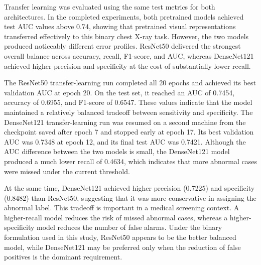 Transfer learning was evaluated using the same test metrics for both architectures. In the completed experiments, both pretrained models achieved test AUC values above 0.74, showing that pretrained visual representations transferred effectively to this binary chest X-ray task. However, the two models produced noticeably different error profiles. ResNet50 delivered the strongest overall balance across accuracy, recall, F1-score, and AUC, whereas DenseNet121 achieved higher precision and specificity at the cost of substantially lower recall.

\begin{table}[htbp]
    \centering
    \caption{Results for models trained with transfer learning}
    \label{tab:transfer-results}
\end{table}

The ResNet50 transfer-learning run completed all 20 epochs and achieved its best validation AUC at epoch 20. On the test set, it reached an AUC of 0.7454, accuracy of 0.6955, and F1-score of 0.6547. These values indicate that the model maintained a relatively balanced tradeoff between sensitivity and specificity. The DenseNet121 transfer-learning run was resumed on a second machine from the checkpoint saved after epoch 7 and stopped early at epoch 17. Its best validation AUC was 0.7348 at epoch 12, and its final test AUC was 0.7421. Although the AUC difference between the two models is small, the DenseNet121 model produced a much lower recall of 0.4634, which indicates that more abnormal cases were missed under the current threshold.

At the same time, DenseNet121 achieved higher precision (0.7225) and specificity (0.8482) than ResNet50, suggesting that it was more conservative in assigning the abnormal label. This tradeoff is important in a medical screening context. A higher-recall model reduces the risk of missed abnormal cases, whereas a higher-specificity model reduces the number of false alarms. Under the binary formulation used in this study, ResNet50 appears to be the better balanced model, while DenseNet121 may be preferred only when the reduction of false positives is the dominant requirement.

